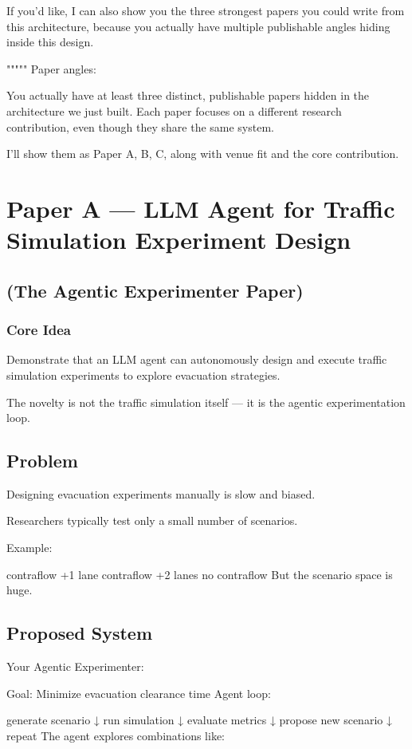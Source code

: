 If you'd like, I can also show you the three strongest papers you could write from this architecture, because you actually have multiple publishable angles hiding inside this design.

"""""
Paper angles:

You actually have at least three distinct, publishable papers hidden in the architecture we just built. Each paper focuses on a different research contribution, even though they share the same system.

I’ll show them as Paper A, B, C, along with venue fit and the core contribution.

\chapter*{Paper A — LLM Agent for Traffic Simulation Experiment Design}
\section*{(The Agentic Experimenter Paper)}
\subsection*{Core Idea}
Demonstrate that an LLM agent can autonomously design and execute traffic simulation experiments to explore evacuation strategies.

The novelty is not the traffic simulation itself — it is the agentic experimentation loop.

\section*{Problem}
Designing evacuation experiments manually is slow and biased.

Researchers typically test only a small number of scenarios.

Example:

contraflow +1 lane
contraflow +2 lanes
no contraflow
But the scenario space is huge.

\section*{Proposed System}
Your Agentic Experimenter:

Goal:
Minimize evacuation clearance time
Agent loop:

generate scenario
↓
run simulation
↓
evaluate metrics
↓
propose new scenario
↓
repeat
The agent explores combinations like:

